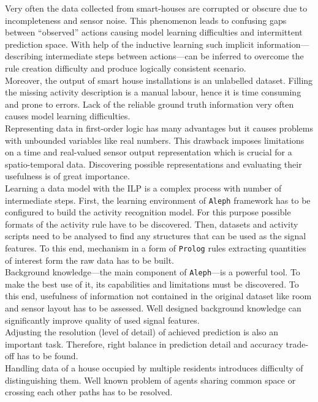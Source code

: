 \documentclass[10pt, a4paper, pdflatex, leqno, twoside, openright]{report}
\begin{document}
Very often the data collected from smart-houses are corrupted or obscure due to incompleteness and sensor noise. This phenomenon leads to confusing gaps between ``observed'' actions causing model learning difficulties and intermittent prediction space. With help of the inductive learning such implicit information---describing intermediate steps between actions---can be inferred to overcome the rule creation difficulty and produce logically consistent scenario.\\
Moreover, the output of smart house installations is an unlabelled dataset. Filling the missing activity description is a manual labour, hence it is time consuming and prone to errors. Lack of the reliable ground truth information very often causes model learning difficulties.\\

Representing data in first-order logic has many advantages but it causes problems with unbounded variables like real numbers. This drawback imposes limitations on a time and real-valued sensor output representation which is crucial for a spatio-temporal data. Discovering possible representations and evaluating their usefulness is of great importance.\\

Learning a data model with the ILP is a complex process with number of intermediate steps. First, the learning environment of \texttt{Aleph} framework has to be configured to build the activity recognition model. For this purpose possible formats of the activity rule have to be discovered. Then, datasets and activity scripts need to be analysed to find any structures that can be used as the signal features. To this end, mechanism in a form of \texttt{Prolog} rules extracting quantities of interest form the raw data has to be built.\\
Background knowledge---the main component of \texttt{Aleph}---is a powerful tool. To make the best use of it, its capabilities and limitations must be discovered. To this end, usefulness of information not contained in the original dataset like room and sensor layout has to be assessed. Well designed background knowledge can significantly improve quality of used signal features.\\

Adjusting the resolution (level of detail) of achieved prediction is also an important task. Therefore, right balance in prediction detail and accuracy trade-off has to be found.\\
Handling data of a house occupied by multiple residents introduces difficulty of distinguishing them. Well known problem of agents sharing common space or crossing each other paths has to be resolved.\\
\end{document}
